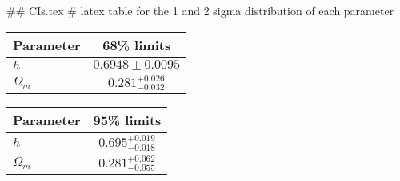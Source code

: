 ## CIs.tex
# latex table for the 1 and 2 sigma distribution of each parameter

\begin{tabular} { l  c}
 Parameter &  68\% limits\\
\hline
{\boldmath$h              $} & $0.6948\pm 0.0095          $\\
{\boldmath$\Omega_m       $} & $0.281^{+0.026}_{-0.032}   $\\
\hline
\end{tabular}

\begin{tabular} { l  c}
 Parameter &  95\% limits\\
\hline
{\boldmath$h              $} & $0.695^{+0.019}_{-0.018}   $\\
{\boldmath$\Omega_m       $} & $0.281^{+0.062}_{-0.055}   $\\
\hline
\end{tabular}
